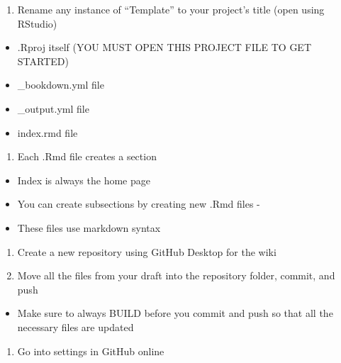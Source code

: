 \documentclass[]{book}
\providecommand{\tightlist}{%
  \setlength{\itemsep}{0pt}\setlength{\parskip}{0pt}}
\begin{document}
\begin{enumerate}
\def\labelenumi{\arabic{enumi}.}
\setcounter{enumi}{1}
\tightlist
\item
  Rename any instance of ``Template'' to your project's title (open using RStudio)
\end{enumerate}

\begin{itemize}
\tightlist
\item
  .Rproj itself (YOU MUST OPEN THIS PROJECT FILE TO GET STARTED)
\item
  \_bookdown.yml file
\item
  \_output.yml file
\item
  index.rmd file
\end{itemize}

\begin{enumerate}
\def\labelenumi{\arabic{enumi}.}
\setcounter{enumi}{2}
\tightlist
\item
  Each .Rmd file creates a section
\end{enumerate}

\begin{itemize}
\tightlist
\item
  Index is always the home page
\item
  You can create subsections by creating new .Rmd files -
\item
  These files use markdown syntax
\end{itemize}

\begin{enumerate}
\def\labelenumi{\arabic{enumi}.}
\setcounter{enumi}{3}
\item
  Create a new repository using GitHub Desktop for the wiki
\item
  Move all the files from your draft into the repository folder, commit, and push
\end{enumerate}

\begin{itemize}
\tightlist
\item
  Make sure to always BUILD before you commit and push so that all the necessary files are updated
\end{itemize}

\begin{enumerate}
\def\labelenumi{\arabic{enumi}.}
\setcounter{enumi}{5}
\tightlist
\item
  Go into settings in GitHub online
\end{enumerate}
\end{document}
